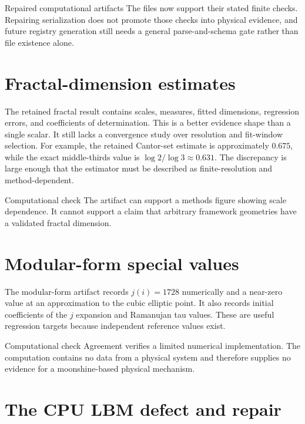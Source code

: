\begin{evidence}{Repaired computational artifacts}
The files now support their stated finite checks. Repairing serialization does
not promote those checks into physical evidence, and future registry generation
still needs a general parse-and-schema gate rather than file existence alone.
\end{evidence}

\section{Fractal-dimension estimates}

The retained fractal result contains scales, measures, fitted dimensions,
regression errors, and coefficients of determination. This is a better evidence
shape than a single scalar. It still lacks a convergence study over resolution
and fit-window selection. For example, the retained Cantor-set estimate is
approximately $0.675$, while the exact middle-thirds value is
$\log 2/\log 3\approx0.631$. The discrepancy is large enough that the estimator
must be described as finite-resolution and method-dependent.

\begin{evidence}{Computational check}
The artifact can support a methods figure showing scale dependence. It cannot
support a claim that arbitrary framework geometries have a validated fractal
dimension.
\end{evidence}

\section{Modular-form special values}

The modular-form artifact records $j(i)=1728$ numerically and a near-zero value
at an approximation to the cubic elliptic point. It also records initial
coefficients of the $j$ expansion and Ramanujan tau values. These are useful
regression targets because independent reference values exist.

\begin{evidence}{Computational check}
Agreement verifies a limited numerical implementation. The computation contains
no data from a physical system and therefore supplies no evidence for a
moonshine-based physical mechanism.
\end{evidence}

\section{The CPU LBM defect and repair}

